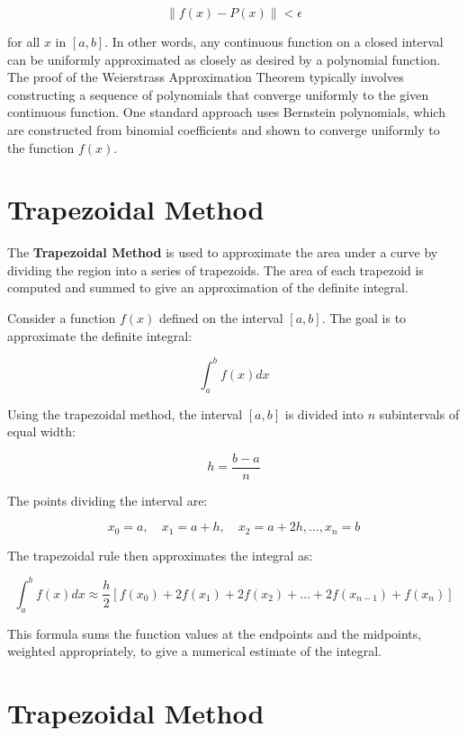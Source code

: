 \documentclass[12pt]{report} %
\begin{document}
\begin{equation}
    \|f(x) - P(x)\| < \epsilon
\end{equation}

for all \(x\) in \([a, b]\). In other words, any continuous function on a closed interval can be uniformly approximated as closely as desired by a polynomial function. The proof of the Weierstrass Approximation Theorem typically involves constructing a sequence of polynomials that converge uniformly to the given continuous function. One standard approach uses Bernstein polynomials, which are constructed from binomial coefficients and shown to converge uniformly to the function \(f(x)\).

\section{Trapezoidal Method}
The \textbf{Trapezoidal Method} is used to approximate the area under a curve by dividing the region into a series of trapezoids. The area of each trapezoid is computed and summed to give an approximation of the definite integral.

Consider a function \(f(x)\) defined on the interval \([a, b]\). The goal is to approximate the definite integral:

\begin{equation}
    \int_a^b f(x) dx
\end{equation}

Using the trapezoidal method, the interval \([a, b]\) is divided into \(n\) subintervals of equal width:

\[
h = \frac{b - a}{n}
\]

The points dividing the interval are:

\[
x_0 = a, \quad x_1 = a + h, \quad x_2 = a + 2h, \dots, x_n = b
\]

The trapezoidal rule then approximates the integral as:

\begin{equation}
    \int_a^b f(x) dx \approx \frac{h}{2} \left[ f(x_0) + 2f(x_1) + 2f(x_2) + \dots + 2f(x_{n-1}) + f(x_n) \right]
\end{equation}

This formula sums the function values at the endpoints and the midpoints, weighted appropriately, to give a numerical estimate of the integral.

\section{Trapezoidal Method}
\end{document}
